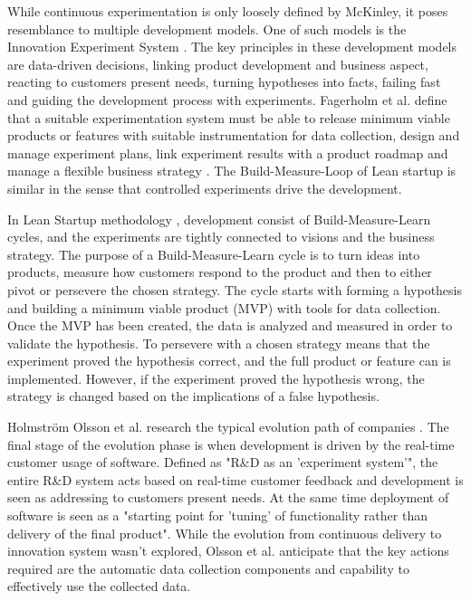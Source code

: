 \documentclass[english, grading]{tktltiki2}
\theoremstyle{definition}
\theoremstyle{remark}
\begin{document}
While continuous experimentation is only loosely defined by McKinley, it poses resemblance to multiple development models. One of such models is the Innovation Experiment System \cite{bosch2012building}. The key principles in these development models are data-driven decisions, linking product development and business aspect, reacting to customers present needs, turning hypotheses into facts, failing fast and guiding the development process with experiments. Fagerholm et al. define that a suitable experimentation system must be able to release minimum viable products or features with suitable instrumentation for data collection, design and manage experiment plans, link experiment results with a product roadmap and manage a flexible business strategy \cite{fagerholm2014building}. The Build-Measure-Loop of Lean startup is similar in the sense that controlled experiments drive the development.

In Lean Startup methodology \cite{ries2011lean}, development consist of Build-Measure-Learn cycles, and the experiments are tightly connected to visions and the business strategy. The purpose of a Build-Measure-Learn cycle is to turn ideas into products, measure how customers respond to the product and then to either pivot or persevere the chosen strategy. The cycle starts with forming a hypothesis and building a minimum viable product (MVP) with tools for data collection. Once the MVP has been created, the data is analyzed and measured in order to validate the hypothesis. To persevere with a chosen strategy means that the experiment proved the hypothesis correct, and the full product or feature can is implemented. However, if the experiment proved the hypothesis wrong, the strategy is changed based on the implications of a false hypothesis.

Holmström Olsson et al. research the typical evolution path of companies \cite{olsson2012climbing}. The final stage of the evolution phase is when development is driven by the real-time customer usage of software. Defined as "R\&D as an 'experiment system'", the entire R\&D system acts based on real-time customer feedback and development is seen as addressing to customers present needs. At the same time deployment of software is seen as a "starting point for 'tuning' of functionality rather than delivery of the final product". While the evolution from continuous delivery to innovation system wasn't explored, Olsson et al. anticipate that the key actions required are the automatic data collection components and capability to effectively use the collected data.
\end{document}
